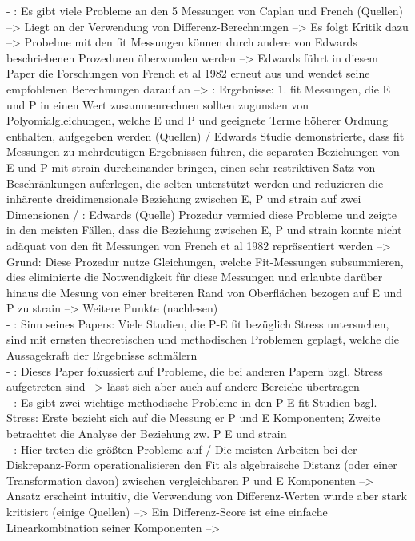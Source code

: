 - \cite[S. 2]{edwards:1993}: Es gibt viele Probleme an den 5 Messungen von Caplan und French (Quellen) --> Liegt an der Verwendung von Differenz-Berechnungen --> Es folgt Kritik dazu --> Probelme mit den fit Messungen können durch andere von Edwards beschriebenen Prozeduren überwunden werden --> Edwards führt in diesem Paper die Forschungen von French et al 1982 erneut aus und wendet seine empfohlenen Berechnungen darauf an --> \cite[S. 19]{edwards:1993}: Ergebnisse: 1. fit Messungen, die E und P in einen Wert zusammenrechnen sollten zugunsten von Polyomialgleichungen, welche E und P und geeignete Terme höherer Ordnung enthalten, aufgegeben werden (Quellen) / Edwards Studie demonstrierte, dass fit Messungen zu mehrdeutigen Ergebnissen führen, die separaten Beziehungen von E und P mit strain durcheinander bringen, einen sehr restriktiven Satz von Beschränkungen auferlegen, die selten unterstützt werden und reduzieren die inhärente dreidimensionale Beziehung zwischen E, P und strain auf zwei Dimensionen / \cite[S. 20]{edwards:1993}: Edwards (Quelle) Prozedur vermied diese Probleme und zeigte in den meisten Fällen, dass die Beziehung zwischen E, P und strain konnte nicht adäquat von den fit Messungen von French et al 1982 repräsentiert werden --> Grund: Diese Prozedur nutze Gleichungen, welche Fit-Messungen subsummieren, dies eliminierte die Notwendigkeit für diese Messungen und erlaubte darüber hinaus die Mesung von einer breiteren Rand von Oberflächen bezogen auf E und P zu strain --> Weitere Punkte (nachlesen) \\
- \cite[S. 2]{edwards:1990}: Sinn seines Papers: Viele Studien, die P-E fit bezüglich Stress untersuchen, sind mit ernsten theoretischen und methodischen Problemen geplagt, welche die Aussagekraft der Ergebnisse schmälern \\
- \cite[S. 3]{edwards:1990}: Dieses Paper fokussiert auf Probleme, die bei anderen Papern bzgl. Stress aufgetreten sind --> lässt sich aber auch auf andere Bereiche übertragen \\
- \cite[S. 7]{edwards:1990}: Es gibt zwei wichtige methodische Probleme in den P-E fit Studien bzgl. Stress: Erste bezieht sich auf die Messung er P und E Komponenten; Zweite betrachtet die Analyse der Beziehung zw. P E und strain \\
- \cite[S. 9]{edwards:1990}: Hier treten die größten Probleme auf / Die meisten Arbeiten bei der Diskrepanz-Form operationalisieren den Fit als algebraische Distanz (oder einer Transformation davon) zwischen vergleichbaren P und E Komponenten --> Ansatz erscheint intuitiv, die Verwendung von Differenz-Werten wurde aber stark kritisiert (einige Quellen) --> Ein Differenz-Score ist eine einfache Linearkombination seiner Komponenten --> \\
